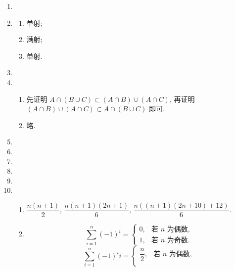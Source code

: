 \documentclass[a4paper, 11pt]{ctexart}
\begin{document}
    \begin{enumerate}
        \item %
        \item %
            \begin{multicols}{3}
                \begin{enumerate}[(1)]
                    \item %
                        单射;
                    \item %
                        满射;
                    \item %
                        单射.
                \end{enumerate}
            \end{multicols}
        \item %
        \item %
            \begin{enumerate}[(1)]
                \item %
                    先证明 $A \cap (B \cup C) \subset (A \cap B) \cup (A \cap C)$, 再证明 $(A \cap B) \cup (A \cap C) \subset A \cap (B \cup C)$ 即可.
                \item %
                    略.
            \end{enumerate}
        \item %
        \item %
        \item %
        \item %
        \item %
        \item %
            \begin{enumerate}[(1)]
                \item %
                    $\dfrac{n(n+1)}{2}$, $\dfrac{n(n+1)(2n+1)}{6}$, $\dfrac{n((n+1)(2n+10) + 12)}{6}$.
                \item %
                    \[
                        \sum_{i=1}^n(-1)^i =
                        \begin{cases}
                            0, & \text{若 $n$ 为偶数}, \\
                            1, & \text{若 $n$ 为奇数}.
                        \end{cases}    
                    \]
                    \[
                        \sum_{i=1}^n(-1)^ii =
                        \begin{cases}
                            \dfrac{n}{2}, & \text{若 $n$ 为偶数}, \\

\end{cases}\]
\end{enumerate}
\end{enumerate}
\end{document}
